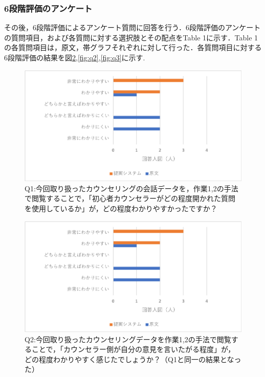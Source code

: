 \documentclass[shuuron]{kuee}
\begin{document}
\subsubsection{6段階評価のアンケート}

その後，6段階評価によるアンケート質問に回答を行う．6段階評価のアンケートの質問項目，および各質問に対する選択肢とその配点をTable 1に示す．Table 1の各質問項目は，原文，帯グラフそれぞれに対して行った．各質問項目に対する6段階評価の結果を図\ref{fig:q1},\ref{fig:q2},\ref{fig:q3}に示す.



\begin{figure}
  \begin{center}
    \includegraphics[width=\linewidth]{q1.png}
  \end{center}
  \caption{Q1:今回取り扱ったカウンセリングの会話データを，作業1,2の手法で閲覧することで，「初心者カウンセラーがどの程度開かれた質問を使用しているか」が，どの程度わかりやすかったですか？}
  \label{fig:q1}
\end{figure}

\begin{figure}
  \begin{center}
    \includegraphics[width=\linewidth]{q1.png}
  \end{center}
  \caption{Q2:今回取り扱ったカウンセリングデータを作業1,2の手法で閲覧することで，「カウンセラー側が自分の意見を言いたがる程度」が，どの程度わかりやすく感じたでしょうか？（Q1と同一の結果となった）}
  \label{fig:q1}
\end{figure}
\end{document}
